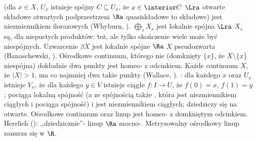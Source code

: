  (dla $x \in X$, $U_x$ istnieje spójny $C \subseteq U_x$, że $x \in \interior C$ $\Lra$ otwarte składowe otwartych podprzestrzeni $\Ra$ quasiskładowe to składowe) jest niezmiennikiem ilorazowych (Whyburn, ).
$\bigoplus_s X_s$ jest lokalnie spójna $\Lra$ $X_s$ są, dla niepustych produktów: też, ale tylko skończenie wiele może być niespójnych.
Uzwarcenie $\beta X$ jest lokalnie spójne $\Ra$ $X$ pseudozwarta (Banaschewski, ).
Ośrodkowe continuum, którego nie  (domknięty $\{x\}$, że $X \setminus \{x\}$ niespójna) dokładnie dwa punkty jest homeo- z odcinkiem.
Każde continuum $X$, że $|X| > 1$, ma co najmniej dwa takie punkty (Wallace, ).
: dla każdego $x$ oraz $U_x$ istnieje $V_x$, że dla każdego $y \in V$ istnieje ciągłe $f \colon I \to U$, że $f(0) = x$, $f(1) = y$; pociąga lokalną spójność (a ze spójnością także , która jest niezmiennikiem ciągłych i pociąga spójność) i jest niezmiennikiem ciągłych; dziedziczy się na otwarte.
Ośrodkowe continuum oraz linup jest homeo- z domkniętym odcinkiem.
Herrlich (): ,,dziedzicznie''- linup $\Ra$ mocno-.
Metryzowalny ośrodkowy linup zanurza się w $\R$.
